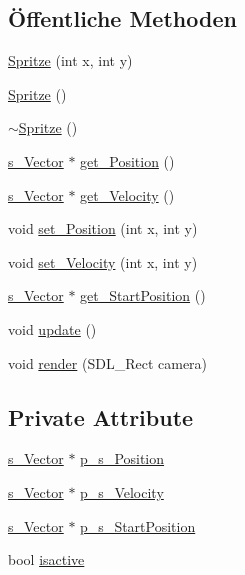 \subsection*{Öffentliche Methoden}
\begin{DoxyCompactItemize}
\item 
\hyperlink{class_spritze_a786a149a9e6a937af87566a5c0ab432e}{Spritze} (int x, int y)
\item 
\hyperlink{class_spritze_a4cca3fc867fc55f6dde677c045d459d1}{Spritze} ()
\item 
\hyperlink{class_spritze_a5b57faf9fa3bccc91845bb399233c795}{$\sim$\-Spritze} ()
\item 
\hyperlink{structs___vector}{s\-\_\-\-Vector} $\ast$ \hyperlink{class_spritze_aef30f9337f9559b4873ee895a0c8f4fe}{get\-\_\-\-Position} ()
\item 
\hyperlink{structs___vector}{s\-\_\-\-Vector} $\ast$ \hyperlink{class_spritze_ad5f7645d831b543b1ca92bd4ccb9c876}{get\-\_\-\-Velocity} ()
\item 
void \hyperlink{class_spritze_acab9a7ff57ce3ce2f33a3480d04cbe19}{set\-\_\-\-Position} (int x, int y)
\item 
void \hyperlink{class_spritze_aa54b894d1a40b2c1156eb0e62779fa0e}{set\-\_\-\-Velocity} (int x, int y)
\item 
\hyperlink{structs___vector}{s\-\_\-\-Vector} $\ast$ \hyperlink{class_spritze_a5d305371f76fb207684c203e7b4e5fd8}{get\-\_\-\-Start\-Position} ()
\item 
void \hyperlink{class_spritze_aaf70068b9356284874156f19f5237c94}{update} ()
\item 
void \hyperlink{class_spritze_a2d1fac0870a40d50f0582e1efec53751}{render} (S\-D\-L\-\_\-\-Rect camera)
\end{DoxyCompactItemize}
\subsection*{Private Attribute}
\begin{DoxyCompactItemize}
\item 
\hyperlink{structs___vector}{s\-\_\-\-Vector} $\ast$ \hyperlink{class_spritze_a209c9c2761b8fa8503543276cd01de6a}{p\-\_\-s\-\_\-\-Position}
\item 
\hyperlink{structs___vector}{s\-\_\-\-Vector} $\ast$ \hyperlink{class_spritze_ab77cbb384ea5d2b34f9da2829e7e9a12}{p\-\_\-s\-\_\-\-Velocity}
\item 
\hyperlink{structs___vector}{s\-\_\-\-Vector} $\ast$ \hyperlink{class_spritze_ab2aa8224814d8de17367b7499341fe2e}{p\-\_\-s\-\_\-\-Start\-Position}
\item 
bool \hyperlink{class_spritze_a313b06a86c7b0d082c2479e9e35a8b4d}{isactive}
\end{DoxyCompactItemize}


